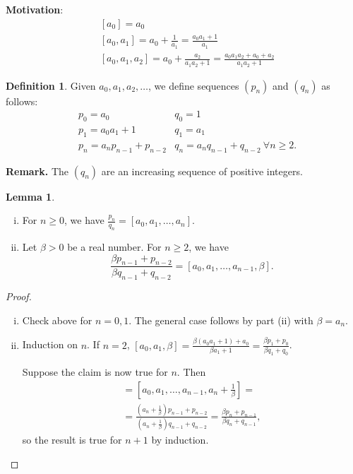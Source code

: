 \documentclass{article}
\theoremstyle{definition}
\newtheorem{lemma}[theorem]{Lemma}
\newtheorem{defn}{Definition}[section]
\begin{document}
\textbf{Motivation}:
\begin{align*}
    &[a_0]=a_0 \\
    &[a_0,a_1]=a_0+\frac{1}{a_1}=\frac{a_0a_1+1}{a_1}\\
    &[a_0,a_1,a_2]=a_0 + \frac{a_2}{a_1a_2+1} = \frac{a_0a_1a_2+a_0+a_2}{a_1a_2+1}
\end{align*}
\begin{defn}
    Given $a_0,a_1,a_2,\ldots$, we define sequences $(p_n)$ and $(q_n)$ as follows:
    \begin{align*}
        &p_0=a_0 &q_0=1 \\
        &p_1=a_0a_1+1 &q_1=a_1 \\
        &p_n=a_np_{n-1}+p_{n-2} &q_n=a_nq_{n-1}+q_{n-2} ~\forall n\ge 2. 
    \end{align*}
\end{defn}
\textbf{Remark.} The $(q_n)$ are an increasing sequence of positive integers.
\begin{lemma}\label{6.2}
    \begin{enumerate}[(i)]
        \item For $n\ge 0$, we have $\frac{p_n}{q_n}=[a_0,a_1,\ldots,a_n]$.
        \item Let $\beta>0$ be a real number. For $n\ge 2$, we have $$\frac{\beta p_{n-1}+p_{n-2}}{\beta q_{n-1}+q_{n-2}}=[a_0,a_1,\ldots,a_{n-1},\beta].$$
    \end{enumerate}
\end{lemma}
\begin{proof}
    \begin{enumerate}[(i)]
        \item Check above for $n=0,1$. The general case follows by part (ii) with $\beta=a_n$.
        \item Induction on $n$. If $n=2$, $[a_0,a_1,\beta]=\frac{\beta(a_0a_1+1)+a_0}{\beta a_1+1} = \frac{\beta p_1 + p_0}{\beta q_1 + q_0}$.
        \vspace{1mm}
        
        Suppose the claim is now true for $n$. Then
        \begin{align*}
            [a_0,\ldots,a_n,\beta] = [a_0,a_1,\ldots,a_{n-1},a_n+\frac{1}{\beta}]=\\
            =\frac{(a_n+\frac{1}{\beta})p_{n-1}+p_{n-2}}{(a_n+\frac{1}{\beta})q_{n-1}+q_{n-2}} = \frac{\beta p_n + p_{n-1}}{\beta q_n + q_{n-1}},
        \end{align*}
        so the result is true for $n+1$ by induction.
    \end{enumerate}
\end{proof}
\end{document}
